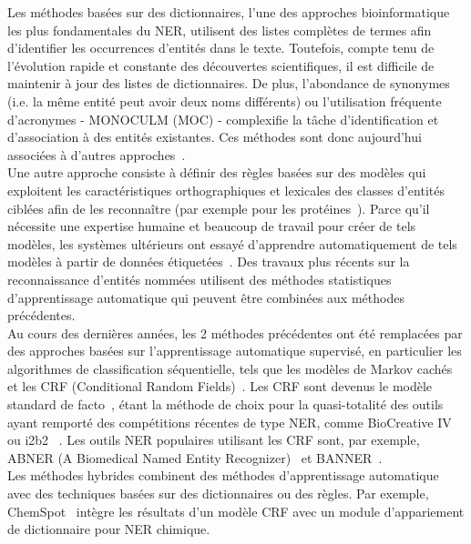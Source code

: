 Les méthodes basées sur des dictionnaires, l'une des approches bioinformatique les plus fondamentales du NER, utilisent des listes complètes de termes afin d'identifier les occurrences d'entités dans le texte. Toutefois, compte tenu de l'évolution rapide et constante des découvertes scientifiques, il est difficile de maintenir à jour des listes de dictionnaires. De plus, l'abondance de synonymes (i.e. la même entité peut avoir deux noms différents) ou l'utilisation fréquente d'acronymes - MONOCULM (MOC) - complexifie la tâche d'identification et d'association à des entités existantes. Ces méthodes sont donc aujourd'hui associées à d'autres approches~\cite{Hettne2009,Gerner2010}. \\

Une autre approche consiste à définir des règles basées sur des modèles qui exploitent les caractéristiques orthographiques et lexicales des classes d'entités ciblées afin de les reconnaître (par exemple pour les protéines~\cite{Franzen2002}). Parce qu'il nécessite une expertise humaine et beaucoup de travail pour créer de tels modèles, les systèmes ultérieurs ont essayé d'apprendre automatiquement de tels modèles à partir de données étiquetées~\cite{Califf1999,Ciravegna1999}. Des travaux plus récents sur la reconnaissance d'entités nommées utilisent des méthodes statistiques d'apprentissage automatique qui peuvent être combinées aux méthodes précédentes. \\

Au cours des dernières années, les 2 méthodes précédentes ont été remplacées par des approches basées sur l'apprentissage automatique supervisé, en particulier les algorithmes de classification séquentielle, tels que les modèles de Markov cachés~\cite{Rabiner1989} et les CRF (Conditional Random Fields)~\cite{Lafferty2001}. Les CRF sont devenus le modèle standard de facto~\cite{Settles2004}, étant la méthode de choix pour la quasi-totalité des outils ayant remporté des compétitions récentes de type NER, comme BioCreative IV~\cite{Krallinger2013} ou i2b2~\cite{Uzuner2011} . Les outils NER populaires utilisant les CRF sont, par exemple, ABNER (A Biomedical Named Entity Recognizer)~\cite{Settles2005} et BANNER~\cite{LEAMAN2007}.\\
Les méthodes hybrides combinent des méthodes d'apprentissage automatique avec des techniques basées sur des dictionnaires ou des règles. Par exemple, ChemSpot~\cite{Rocktaschel2012} intègre les résultats d'un modèle CRF avec un module d'appariement de dictionnaire pour NER chimique.\\

